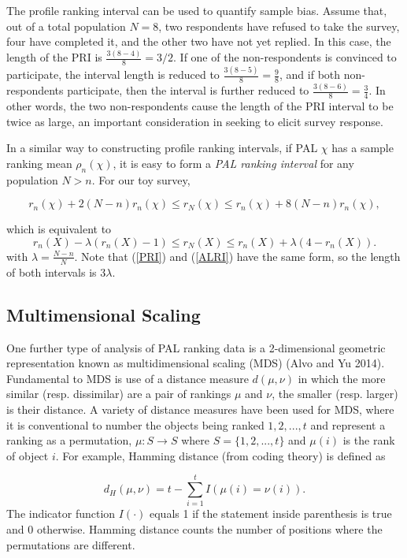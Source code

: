 \documentclass[a4paper, 12pt]{article}
\begin{document}
The profile ranking interval can be used to quantify sample bias. Assume that, out of a total population $N=8$, two respondents have refused to take the survey, four have completed it, and the other two have not yet replied. In this case, the length of the PRI is  $\frac{3(8-4)}{8}=3/2$. If one of the non-respondents is convinced to participate, the interval length is reduced to $\frac{3(8-5)}{8}=\frac{9}{8}$, and if both non-respondents participate, then the interval is further reduced to $\frac{3(8-6)}{8}=\frac{3}{4}$. In other words, the two non-respondents  cause the length of the PRI interval to be twice as large, an important consideration in seeking to elicit survey response.


In a similar way to constructing profile ranking intervals, if PAL $\chi$ has a sample ranking mean $\rho_n(\chi)$, it is easy to form  a \emph{PAL ranking interval} for any population $N>n$. For our toy survey,

\begin{equation}
r_n(\chi)+2(N-n)r_n(\chi)\le r_N(\chi) \le r_n(\chi)+8(N-n)r_n(\chi),
\end{equation}

{\flushleft which} is equivalent to  
\begin{equation}
r_n(X)-\lambda(r_n(X)-1)\le r_N(X) \le r_n(X) + \lambda(4-r_n(X)).
\label{ALRI}
\end{equation}
{\flushleft with} $\lambda=\frac{N-n}{N}$. Note that (\ref{PRI}) and (\ref{ALRI}) have the same form, so the length of both intervals is $3\lambda$.

\subsection{Multimensional Scaling}
One further type of analysis of PAL ranking data is a 2-dimensional geometric representation known as multidimensional scaling (MDS) (Alvo and Yu 2014). 
Fundamental to MDS is use of a distance measure $d(\mu,\nu)$ in which the more similar (resp. dissimilar) are a pair of rankings $\mu$ and $\nu$, the smaller (resp. larger) is their distance.  A variety of distance measures have been used for MDS, where it is conventional to number the objects being ranked $1,2,...,t$ and represent a ranking as a permutation, $\mu:S\rightarrow S$ where $S=\{1,2,...,t\}$ and $\mu(i)$ is the rank of object $i$. For example, Hamming distance (from coding theory) is defined as
 
 \begin{equation}
 d_H{(\mu,\nu)}=t-\sum_{i=1}^t I(\mu(i)=\nu(i)).
 \end{equation}
 {\flushleft The} indicator function $I(\cdot)$ equals 1 if the statement inside parenthesis is true and 0 otherwise.  Hamming distance counts the number of positions where the permutations are different.
 
\end{document}
